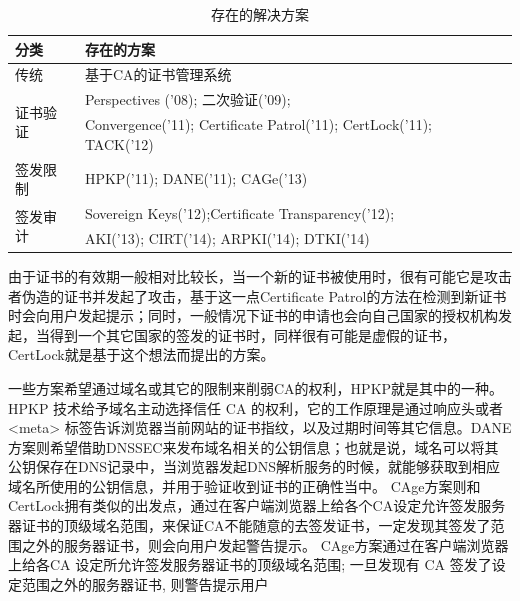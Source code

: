 \renewcommand\arraystretch{2}
\begin{table}[h]
\centering
\begin{tabular}{p{2.5cm}p{12cm}}
	\hline
	分类 & 存在的方案 \\
	\hline
	传统 & \small 基于CA的证书管理系统 \\
	\hline
	\multirow{2}{*}{证书验证} & \small Perspectives ('08)\parencite{wendlandt2008perspectives}; 二次验证('09)\parencite{alicherry2009doublecheck};   \\ \cline{2-2}
	& \small Convergence('11)\parencite{convergence}; Certificate Patrol('11)\parencite{modell2014certificate}; CertLock('11)\parencite{soghoian2011certified}; TACK('12)\parencite{marlinspike2012internet} \\
	\hline
	签发限制 & \small HPKP('11)\parencite{evans2015public}; DANE('11)\parencite{barnes2011dane}; CAGe('13)\parencite{kasten2013cage} \\
	\hline
	\multirow{2}{*}{签发审计} & \small Sovereign Keys('12)\parencite{eckersley2012internet};Certificate Transparency('12)\parencite{laurie2013certificate}; \\ \cline{2-2}
	& \small AKI('13)\parencite{kim2013accountable}; CIRT('14)\parencite{ryan2014enhanced}; ARPKI('14)\parencite{basin2014arpki}; DTKI('14)\parencite{cheval2014dtki}	 \\
	\hline
	
\end{tabular}
\caption{存在的解决方案}\label{proposed} %
\end{table}

由于证书的有效期一般相对比较长，当一个新的证书被使用时，很有可能它是攻击者伪造的证书并发起了攻击，基于这一点Certificate Patrol\cite{modell2014certificate}的方法在检测到新证书时会向用户发起提示；同时，一般情况下证书的申请也会向自己国家的授权机构发起，当得到一个其它国家的签发的证书时，同样很有可能是虚假的证书，CertLock\cite{soghoian2011certified}就是基于这个想法而提出的方案。%



一些方案希望通过域名或其它的限制来削弱CA的权利，HPKP\cite{evans2015public}就是其中的一种。HPKP 技术给予域名主动选择信任 CA 的权利，它的工作原理是通过响应头或者 <meta> 标签告诉浏览器当前网站的证书指纹，以及过期时间等其它信息。DANE\cite{barnes2011dane}方案则希望借助DNSSEC来发布域名相关的公钥信息；也就是说，域名可以将其公钥保存在DNS记录中，当浏览器发起DNS解析服务的时候，就能够获取到相应域名所使用的公钥信息，并用于验证收到证书的正确性当中。
CAge方案则和CertLock拥有类似的出发点，通过在客户端浏览器上给各个CA设定允许签发服务器证书的顶级域名范围，来保证CA不能随意的去签发证书，一定发现其签发了范围之外的服务器证书，则会向用户发起警告提示。
CAge方案通过在客户端浏览器上给各CA 设定所允许签发服务器证书的顶级域名范围; 一旦发现有 CA 签发了设定范围之外的服务器证书, 则警告提示用户

